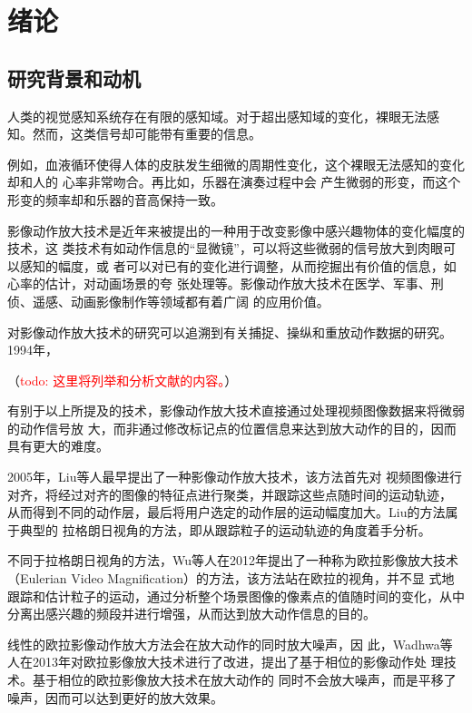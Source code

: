 \chapter{绪论}

\section{研究背景和动机}

人类的视觉感知系统存在有限的感知域。对于超出感知域的变化，裸眼无法感
知。然而，这类信号却可能带有重要的信息。

例如，血液循环使得人体的皮肤发生细微的周期性变化，这个裸眼无法感知的变化却和人的
心率非常吻合。再比如，乐器在演奏过程中会
产生微弱的形变，而这个形变的频率却和乐器的音高保持一致。

影像动作放大技术是近年来被提出的一种用于改变影像中感兴趣物体的变化幅度的技术，这
类技术有如动作信息的“显微镜”，可以将这些微弱的信号放大到肉眼可以感知的幅度，或
者可以对已有的变化进行调整，从而挖掘出有价值的信息，如心率的估计，对动画场景的夸
张处理等。影像动作放大技术在医学、军事、刑侦、遥感、动画影像制作等领域都有着广阔
的应用价值。

对影像动作放大技术的研究可以追溯到有关捕捉、操纵和重放动作数据的研究。1994年，


（\textcolor{red}{todo: 这里将列举和分析文献\cite{wang1994representing,Unuma1995,Gleicher1998,Lee2002,Brand2000,Pullen2002,Li2002,Jojic2001,brostow1999motion}的内容。}）

有别于以上所提及的技术，影像动作放大技术直接通过处理视频图像数据来将微弱的动作信号放
大，而非通过修改标记点的位置信息来达到放大动作的目的，因而具有更大的难度。

2005年，Liu等人最早提出了一种影像动作放大技术，该方法首先对
视频图像进行对齐，将经过对齐的图像的特征点进行聚类，并跟踪这些点随时间的运动轨迹，
从而得到不同的动作层，最后将用户选定的动作层的运动幅度加大。Liu的方法属于典型的
拉格朗日视角的方法，即从跟踪粒子的运动轨迹的角度着手分析。

不同于拉格朗日视角的方法，Wu等人在2012年提出了一种称为欧拉影像放大技术（Eulerian
Video Magnification）的方法，该方法站在欧拉的视角，并不显
式地跟踪和估计粒子的运动，通过分析整个场景图像的像素点的值随时间的变化，从中
分离出感兴趣的频段并进行增强，从而达到放大动作信息的目的。

线性的欧拉影像动作放大方法会在放大动作的同时放大噪声，因
此，Wadhwa等人在2013年对欧拉影像放大技术进行了改进，提出了基于相位的影像动作处
理技术。基于相位的欧拉影像放大技术在放大动作的
同时不会放大噪声，而是平移了噪声，因而可以达到更好的放大效果。

